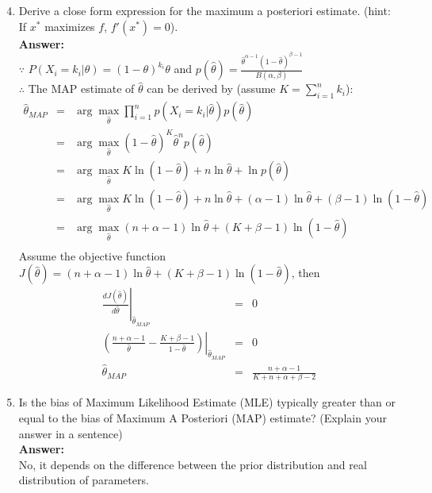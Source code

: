 \documentclass{article}
\begin{document}
\begin{enumerate}
	\setcounter{enumi}{3}
	\item Derive a close form expression for the maximum a posteriori estimate. (hint: If $x^*$ maximizes $f$, $f'(x^*)=0$).
	\\\textbf{Answer:}\\
	$\because$ $P(X_i=k_i|\theta)=(1-\theta)^{k_i}\theta$ and $p(\hat{\theta})=\frac{\hat{\theta}^{\alpha-1}(1-\hat{\theta})^{\beta-1}}{B(\alpha,\beta)}$ \\
	$\therefore$ The MAP estimate of $\hat{\theta}$ can be derived by (assume $K=\sum_{i=1}^{n}k_i$):
	\begin{equation}
	\nonumber
	\begin{array}{rcl}
	\hat{\theta}_{MAP} & = & \arg\max_{\hat{\theta}}\prod_{i=1}^{n}{p(X_i=k_i|\hat{\theta})p(\hat{\theta})} \\
					   & = & \arg\max_{\hat{\theta}}(1-\hat{\theta})^K\hat{\theta}^n p(\hat{\theta}) \\
					   & = & \arg\max_{\hat{\theta}}K\ln{(1-\hat{\theta})}+n\ln{\hat{\theta}}+\ln{p(\hat{\theta})} \\
					   & = & \arg\max_{\hat{\theta}}K\ln{(1-\hat{\theta})}+n\ln{\hat{\theta}}+(\alpha-1)\ln{\hat{\theta}}+(\beta-1)\ln{(1-\hat{\theta})} \\
					   & = & \arg\max_{\hat{\theta}}(n+\alpha-1)\ln{\hat{\theta}}+(K+\beta-1)\ln{(1-\hat{\theta})} \\
	\end{array}
	\end{equation}
	Assume the objective function $J(\hat{\theta})=(n+\alpha-1)\ln{\hat{\theta}}+(K+\beta-1)\ln{(1-\hat{\theta})}$, then
	\begin{equation}
	\nonumber
	\begin{array}{rcl}
	\left. \frac{dJ(\hat{\theta})}{d\hat{\theta}}\right|_{\hat{\theta}_{MAP}} & = & 0 \\
	\left. (\frac{n+\alpha-1}{\hat{\theta}}-\frac{K+\beta-1}{1-\hat{\theta}})\right|_{\hat{\theta}_{MAP}} & = & 0 \\
	\hat{\theta}_{MAP} & = & \frac{n+\alpha-1}{K+n+\alpha+\beta-2}
	\end{array}
	\end{equation}
	
	\item Is the bias of Maximum Likelihood Estimate (MLE) typically greater than or equal to the bias of Maximum A Posteriori (MAP) estimate? (Explain your answer in a sentence)
	\\\textbf{Answer:}\\
	No, it depends on the difference between the prior distribution and real distribution of parameters.
	

\end{enumerate}
\end{document}
